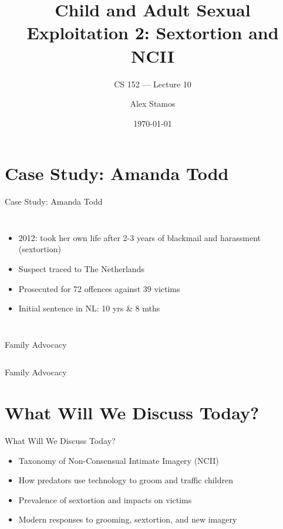 \documentclass[nobackground,dvipsnames,table,aspectratio=169]{beamer}
\title{Child and Adult Sexual Exploitation 2: Sextortion and NCII}
\subtitle{CS 152 --- Lecture 10}
\author[A. Stamos]{Alex Stamos}
\institute[Stanford University]{Stanford Cyber Policy Center}
\date[2022]{\today}
\begin{document}
\begin{frame}
    \titlepage
\end{frame}


\section{Case Study: Amanda Todd}

\begin{frame}{Case Study: Amanda Todd}
    \begin{columns}
            \begin{itemize}
                \item 2012: took her own life after 2-3 years of blackmail and harassment (sextortion)
                \item Suspect traced to The Netherlands
                \item Prosecuted for 72 offences against 39 victims
                \item Initial sentence in NL: 10 yrs & 8 mths
            \end{itemize}
    \end{columns}
\end{frame}

\begin{frame}{Family Advocacy}
    \begin{columns}
    \end{columns}
\end{frame}

\begin{frame}{Family Advocacy}
\end{frame}

\section{What Will We Discuss Today?}

\begin{frame}{What Will We Discuss Today?}
    \large
    \begin{itemize}
        \item Taxonomy of Non-Consensual Intimate Imagery (NCII)
        \item How predators use technology to groom and traffic children
        \item Prevalence of sextortion and impacts on victims
        \item Modern responses to grooming, sextortion, and new imagery
    \end{itemize}
\end{frame}
\end{document}
